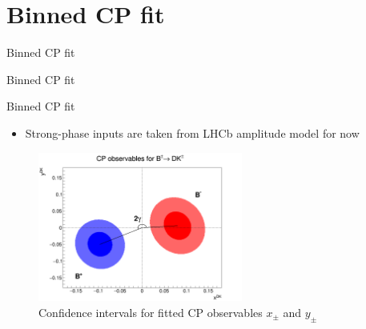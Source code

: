 \documentclass{beamer}
\begin{document}
\section{Binned CP fit}
\begin{frame}{Binned CP fit}
  \begin{center}
    {\huge Binned CP fit} \\
  \end{center}
\end{frame}

\begin{frame}{Binned CP fit}
  \begin{itemize}
    \setlength\itemsep{1.0em}
    \item{Strong-phase inputs are taken from LHCb amplitude model for now}
  \end{itemize}
  \begin{figure}
    \centering
    \includegraphics[width = 0.6\textwidth]{../Report/Plots/CPContours.png}
    \caption{Confidence intervals for fitted CP observables $x_\pm$ and $y_\pm$}
  \end{figure}
\end{frame}
\end{document}
